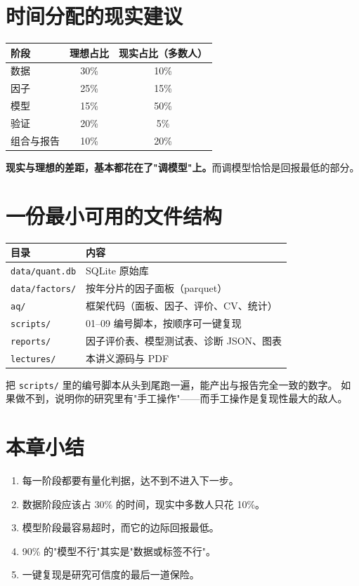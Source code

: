 \section{时间分配的现实建议}

\begin{center}
\begin{tabular}{@{}lcc@{}}
\toprule
阶段 & 理想占比 & 现实占比（多数人） \\
\midrule
数据 & 30\% & 10\% \\
因子 & 25\% & 15\% \\
模型 & 15\% & 50\% \\
验证 & 20\% & 5\% \\
组合与报告 & 10\% & 20\% \\
\bottomrule
\end{tabular}
\end{center}

\textbf{现实与理想的差距，基本都花在了"调模型"上。}而调模型恰恰是回报最低的部分。

\section{一份最小可用的文件结构}

\begin{center}
\begin{tabular}{@{}ll@{}}
\toprule
目录 & 内容 \\
\midrule
\texttt{data/quant.db} & SQLite 原始库 \\
\texttt{data/factors/} & 按年分片的因子面板（parquet） \\
\texttt{aq/} & 框架代码（面板、因子、评价、CV、统计） \\
\texttt{scripts/} & 01--09 编号脚本，按顺序可一键复现 \\
\texttt{reports/} & 因子评价表、模型测试表、诊断 JSON、图表 \\
\texttt{lectures/} & 本讲义源码与 PDF \\
\bottomrule
\end{tabular}
\end{center}

\begin{keybox}[可复现的最后一道保险]
把 \texttt{scripts/} 里的编号脚本从头到尾跑一遍，能产出与报告完全一致的数字。
如果做不到，说明你的研究里有"手工操作"——而手工操作是复现性最大的敌人。
\end{keybox}

\section{本章小结}

\begin{enumerate}
  \item 每一阶段都要有量化判据，达不到不进入下一步。
  \item 数据阶段应该占 30\% 的时间，现实中多数人只花 10\%。
  \item 模型阶段最容易超时，而它的边际回报最低。
  \item 90\% 的"模型不行"其实是"数据或标签不行"。
  \item 一键复现是研究可信度的最后一道保险。
\end{enumerate}
